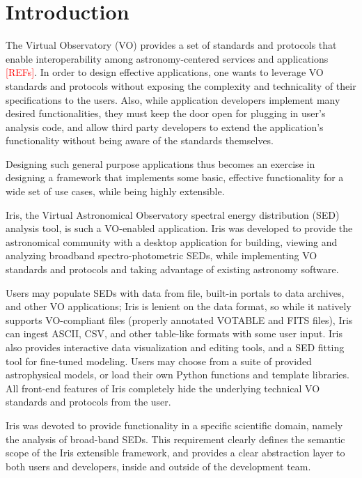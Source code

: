 \label{sec:introduction}
\section{Introduction} 
The Virtual Observatory (VO) provides a set of standards and protocols that enable interoperability among astronomy-centered services and applications \textcolor{red}{[REFs]}.
In order to design effective applications, one wants to leverage VO standards and protocols without exposing the complexity and technicality of their specifications to the users. Also, while application developers implement many desired functionalities, they must keep the door open for plugging in user's analysis code, and allow third party developers to extend the application's functionality without being aware of the standards themselves.

Designing such general purpose applications thus becomes an exercise in designing a framework that implements some basic, effective functionality for a wide set of use cases, while being highly extensible.

Iris, the Virtual Astronomical Observatory spectral energy distribution (SED) analysis tool, is such a VO-enabled application. Iris was developed to provide the astronomical community with a desktop application for building, viewing and analyzing broadband spectro-photometric SEDs, while implementing VO standards and protocols and taking advantage of existing astronomy software.

Users may populate SEDs with data from file, built-in portals to data archives, and other VO applications; Iris is lenient on the data format, so while it natively supports VO-compliant files (properly annotated VOTABLE and FITS files), Iris can ingest ASCII, CSV, and other table-like formats with some user input. Iris also provides interactive data visualization and editing tools, and a SED fitting tool for fine-tuned modeling. Users may choose from a suite of provided astrophysical models, or load their own Python functions and template libraries. All front-end features of Iris completely hide the underlying technical VO standards and protocols from the user.

Iris was devoted to provide functionality in a specific scientific domain, namely the analysis of broad-band SEDs. This requirement clearly defines the semantic scope of the  Iris extensible framework, and provides a clear abstraction layer to both users and developers, inside and outside of the development team.

